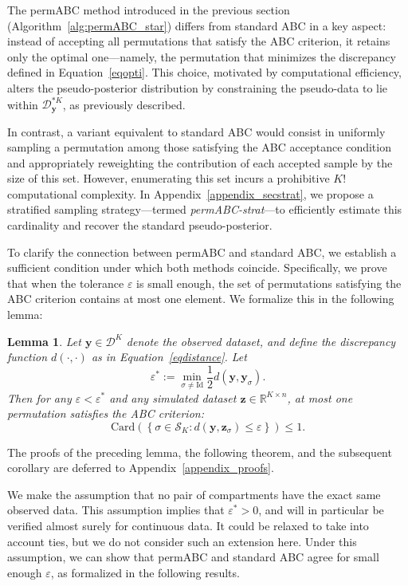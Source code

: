 \documentclass[11pt,a4paper]{article}
\def\dataspace{\mathcal{D}}
\def\obsdata{\mathbf{y}}
\def\simdata{\mathbf{z}}
\theoremstyle{plain}
\newtheorem{lemma}[theorem]{Lemma}
\theoremstyle{definition}
\theoremstyle{remark}
\begin{document}
The permABC method introduced in the previous section (Algorithm~\ref{alg:permABC_star}) differs from standard ABC in a key aspect: instead of accepting all permutations that satisfy the ABC criterion, it retains only the optimal one—namely, the permutation that minimizes the discrepancy defined in Equation~\eqref{eqopti}. This choice, motivated by computational efficiency, alters the pseudo-posterior distribution by constraining the pseudo-data to lie within $\dataspace^{*K}_{\obsdata}$, as previously described.

In contrast, a variant equivalent to standard ABC would consist in uniformly sampling a permutation among those satisfying the ABC acceptance condition and appropriately reweighting the contribution of each accepted sample by the size of this set. However, enumerating this set incurs a prohibitive $K!$ computational complexity. In Appendix~\ref{appendix_secstrat}, we propose a stratified sampling strategy—termed \emph{permABC-strat}—to efficiently estimate this cardinality and recover the standard pseudo-posterior.

To clarify the connection between permABC and standard ABC, we establish a sufficient condition under which both methods coincide. Specifically, we prove that when the tolerance $\varepsilon$ is small enough, the set of permutations satisfying the ABC criterion contains at most one element. We formalize this in the following lemma:

\begin{lemma}
\label{lempermABC_star}
Let $\obsdata \in \dataspace^K$ denote the observed dataset, and define the discrepancy function $d(\cdot, \cdot)$ as in Equation~\eqref{eqdistance}. Let
\[
\varepsilon^* := \min_{\sigma \neq \mathrm{Id}} \frac{1}{2} d(\obsdata, \obsdata_\sigma).
\]
Then for any $\varepsilon < \varepsilon^*$ and any simulated dataset $\simdata \in \mathbb{R}^{K \times n}$, at most one permutation satisfies the ABC criterion:
\[
\mathrm{Card} \left( \left\{ \sigma \in \mathcal{S}_K : d(\obsdata, \simdata_\sigma) \leq \varepsilon \right\} \right) \leq 1.
\]
\end{lemma}

The proofs of the preceding lemma, the following theorem, and the subsequent corollary are deferred to Appendix~\ref{appendix_proofs}.


We make the assumption that no pair of compartments have the exact same observed data. This assumption implies that $\varepsilon^*>0$, and will in particular be verified almost surely for continuous data. It could be relaxed to take into account ties, but we do not consider such an extension here. Under this assumption, we can show that permABC and standard ABC agree for small enough $\varepsilon$, as formalized in the following results.
\end{document}
